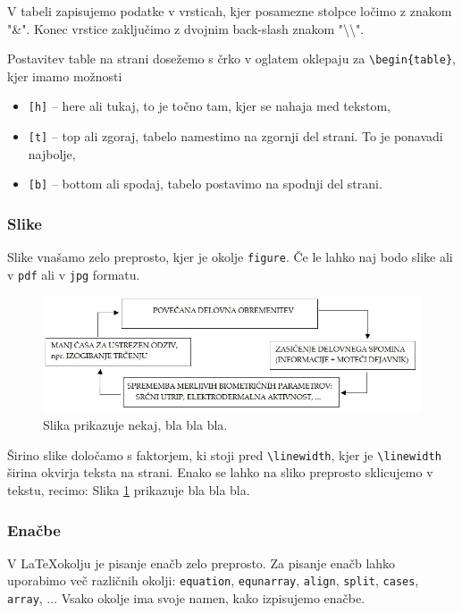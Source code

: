 \documentclass[12pt]{article}
\theoremstyle{definition}
\begin{document}
V tabeli zapisujemo podatke v vrsticah, kjer posamezne stolpce ločimo z znakom "\&". Konec vrstice zaključimo z dvojnim back-slash znakom "\textbackslash\textbackslash".

Postavitev table na strani dosežemo s črko v oglatem oklepaju za \texttt{\textbackslash begin\{table\}}, kjer imamo možnosti

\begin{itemize}[nosep]
	\item \texttt{[h]} -- here ali tukaj, to je točno tam, kjer se nahaja med tekstom,
	\item \texttt{[t]} -- top ali zgoraj, tabelo namestimo na zgornji del strani. To je ponavadi najbolje,
	\item \texttt{[b]} -- bottom ali spodaj, tabelo postavimo na spodnji del strani.
\end{itemize}


\subsubsection{Slike}

Slike vnašamo zelo preprosto, kjer je okolje \texttt{figure}. Če le lahko naj bodo slike ali v \texttt{pdf} ali v \texttt{jpg} formatu.

\begin{figure}[h]
	\begin{center}
		\includegraphics[width=0.7\linewidth]{figs/zasicenje.jpg}
	\end{center}
	\caption{Slika prikazuje nekaj, bla bla bla.}
	\label{fig:slika1}
\end{figure}

Širino slike določamo s faktorjem, ki stoji pred \texttt{\textbackslash linewidth}, kjer je \texttt{\textbackslash linewidth} širina okvirja teksta na strani. Enako se lahko na sliko preprosto sklicujemo v tekstu, recimo: Slika \ref{fig:slika1} prikazuje bla bla bla.

\subsubsection{Enačbe}

V \LaTeX okolju je pisanje enačb zelo preprosto. Za pisanje enačb lahko uporabimo več različnih okolji: \texttt{equation}, \texttt{equnarray}, \texttt{align}, \texttt{split}, \texttt{cases}, \texttt{array}, $\dots$ Vsako okolje ima svoje namen, kako izpisujemo enačbe.
\end{document}
